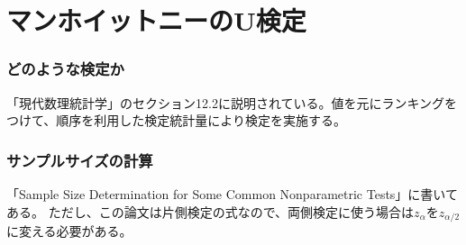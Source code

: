 \section{マンホイットニーのU検定}

\subsubsection{どのような検定か}

「現代数理統計学」のセクション12.2に説明されている。値を元にランキングをつけて、順序を利用した検定統計量により検定を実施する。

\subsubsection{サンプルサイズの計算}

「Sample Size Determination for Some Common Nonparametric Tests」に書いてある。
ただし、この論文は片側検定の式なので、両側検定に使う場合は$z_{\alpha}$を$z_{\alpha/2}$に変える必要がある。
